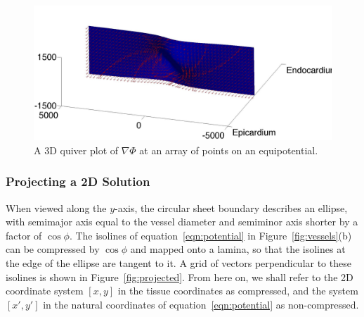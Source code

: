     \begin{figure}[htbp]
      \centering
      \includegraphics[width=1\textwidth]{Ch4/Figs/del_phi}
      \caption{A 3D quiver plot of $\nabla\Phi$ at an array of points on an equipotential.}
      \label{fig:del_phi}
    \end{figure}
  
  \subsubsection{Projecting a 2D Solution} %
  \label{sub:projecting_a_2_d_solution}
    When viewed along the $y$-axis, the circular sheet boundary describes an ellipse, with semimajor axis equal to the vessel diameter and semiminor axis shorter by a factor of $\cos \phi$. The isolines of equation~\ref{eqn:potential} in Figure~\ref{fig:vessels}(b) can be compressed by $\cos \phi$ and mapped onto a lamina, so that the isolines at the edge of the ellipse are tangent to it. A grid of vectors perpendicular to these isolines is shown in Figure~\ref{fig:projected}. From here on, we shall refer to the 2D coordinate system $\left[ x, y \right]$ in the tissue coordinates as compressed, and the system $\left[ x', y' \right]$ in the natural coordinates of equation~\ref{eqn:potential} as non-compressed.
    
